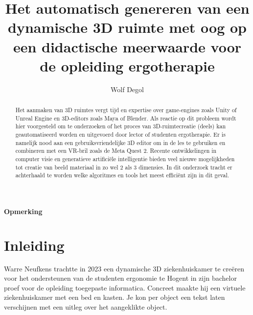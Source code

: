 \documentclass{hogent-article}
\title{Het automatisch genereren  van een dynamische 3D ruimte met oog op een didactische meerwaarde voor de opleiding ergotherapie }
\author{Wolf Degol}
\begin{document}
\begin{abstract}
Het aanmaken van 3D ruimtes vergt tijd en expertise over game-engines zoals Unity of Unreal Engine en 3D-editors zoals Maya of Blender. Als reactie op dit probleem wordt hier voorgesteld om te onderzoeken of het proces van 3D-ruimtecreatie (deels) kan geautomatiseerd worden en uitgevoerd door lector of studenten ergotherapie. Er is namelijk nood aan een gebruiksvriendelijke 3D editor om in de les te gebruiken en combineren met een VR-bril zoals de Meta Quest 2. 
Recente ontwikkelingen in computer visie en generatieve artificiële intelligentie bieden veel nieuwe mogelijkheden tot creatie van beeld materiaal in zo wel 2 als 3 dimensies. In dit onderzoek tracht er achterhaald te worden welke algoritmes en tools het meest efficiënt zijn in dit geval. 

\end{abstract}

\tableofcontents

\bigskip


\paragraph{Opmerking}



\section{Inleiding}%
\label{sec:inleiding}


Warre Neufkens trachtte in 2023 een dynamische 3D ziekenhuiskamer te creëren voor het ondersteunen van de studenten ergonomie te Hogent in zijn bachelor proef voor de opleiding toegepaste informatica. Concreet maakte hij een virtuele ziekenhuiskamer met een bed en kasten. Je kon per object een tekst laten verschijnen met een uitleg over het aangeklikte object.
 
\end{document}
